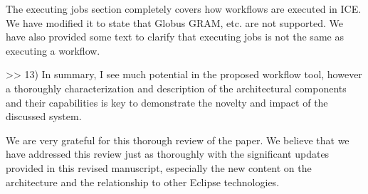 The executing jobs section completely covers how workflows are executed in ICE. We have modified it to state that Globus GRAM, etc. are not supported. We have also provided some text to clarify that executing jobs is not the same as executing a workflow.

>> 13) In summary, I see much potential in the proposed workflow tool, however a thoroughly characterization and description of the architectural components and their capabilities is key to demonstrate the novelty and impact of the discussed system.

We are very grateful for this thorough review of the paper. We believe that we have addressed this review just as thoroughly with the significant updates provided in this revised manuscript, especially the new content on the architecture and the relationship to other Eclipse technologies.